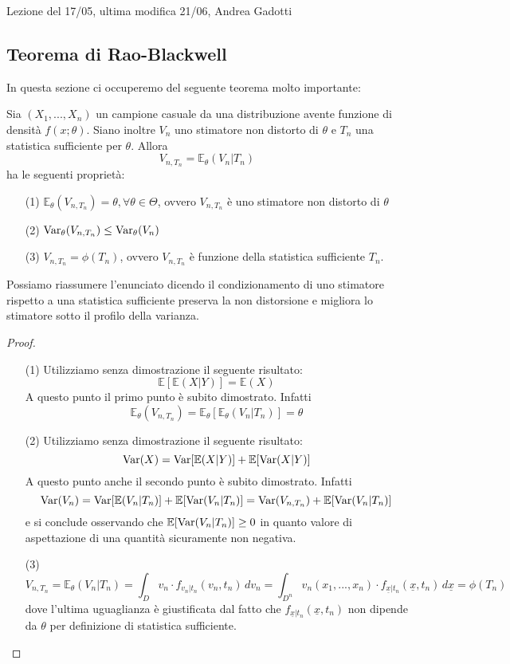 
Lezione del 17/05, ultima modifica 21/06, Andrea Gadotti


\subsection{Teorema di Rao-Blackwell}

In questa sezione ci occuperemo del seguente teorema molto importante:

\begin{teo}

Sia $(X_1,...,X_n)$ un campione casuale da una distribuzione avente funzione di densità $f(x;\theta)$. Siano inoltre $V_n$ uno stimatore non distorto di $\theta$ e $T_n$ una statistica sufficiente per $\theta$. Allora
$$V_{n,T_n} = \mathbb{E}_{\theta}(V_n | T_n)$$
ha le seguenti proprietà:
\begin{enumerate}
\item[(1)] $\mathbb{E}_{\theta}(V_{n,T_n}) = \theta, \forall \theta \in \Theta$, ovvero $V_{n,T_n}$ è uno stimatore non distorto di $\theta$
\item[(2)] $\operatorname{Var}_{\theta}(V_{n,T_n}) \leq \operatorname{Var}_{\theta}(V_n)$
\item[(3)] $V_{n,T_n} = \phi(T_n)$, ovvero $V_{n,T_n}$ è funzione della statistica sufficiente $T_n$.
\end{enumerate}
Possiamo riassumere l'enunciato dicendo il condizionamento di uno stimatore rispetto a una statistica sufficiente preserva la non distorsione e migliora lo stimatore sotto il profilo della varianza.

\begin{proof}
~\begin{enumerate}
\item[(1)] Utilizziamo senza dimostrazione il seguente risultato:
$$\mathbb{E}[\mathbb{E}(X|Y)] = \mathbb{E}(X)$$
A questo punto il primo punto è subito dimostrato. Infatti
$$\mathbb{E}_{\theta}(V_{n,T_n}) = \mathbb{E}_{\theta}[\mathbb{E}_{\theta}(V_n|T_n)] = \theta$$
\item[(2)] Utilizziamo senza dimostrazione il seguente risultato:
$$\operatorname{Var}(X)=\operatorname{Var}[\mathbb{E}(X|Y)] + \mathbb{E}[\operatorname{Var}(X|Y)]$$
A questo punto anche il secondo punto è subito dimostrato. Infatti
$$\operatorname{Var}(V_n) = \operatorname{Var}[\mathbb{E}(V_n|T_n)] + \mathbb{E}[\operatorname{Var}(V_n|T_n)] = \operatorname{Var}(V_{n,T_n}) + \mathbb{E}[\operatorname{Var}(V_n|T_n)]$$
e si conclude osservando che $\mathbb{E}[\operatorname{Var}(V_n|T_n)] \geq 0$ in quanto valore di aspettazione di una quantità sicuramente non negativa.
\item[(3)] $$V_{n,T_n} = \mathbb{E}_{\theta}(V_n | T_n) = \int_D v_n \cdot f_{v_n|t_n}(v_n,t_n) \, dv_n = \int_{D^n} v_n(x_1,...,x_n) \cdot f_{\underline{x}|t_n}(\underline{x},t_n) \, d\underline{x} = \phi(T_n)$$
dove l'ultima uguaglianza è giustificata dal fatto che $f_{\underline{x}|t_n}(\underline{x},t_n)$ non dipende da $\theta$ per definizione di statistica sufficiente.
\end{enumerate}
\end{proof}
\end{teo}

